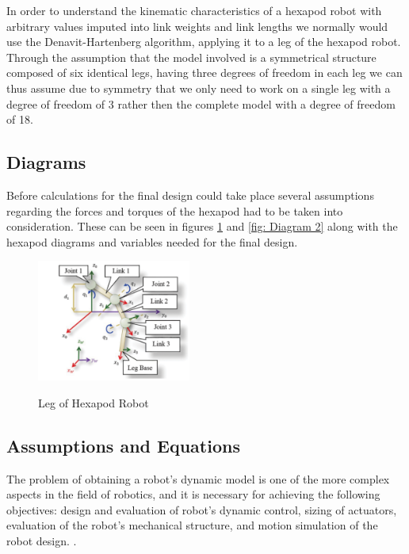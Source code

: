 In order to understand the kinematic characteristics of a hexapod robot with arbitrary values imputed into link weights and link lengths we normally would use the Denavit-Hartenberg algorithm, applying it to a leg of the hexapod robot. Through the assumption that the model involved is a symmetrical structure composed of six identical legs, having three degrees of freedom in each leg we can thus assume due to symmetry that we only need to work on a single leg with a degree of freedom of 3 rather then the complete model with a degree of freedom of 18.



\subsection{Diagrams}
Before calculations for the final design could take place several assumptions regarding the forces and torques of the hexapod had to be taken into consideration. These can be seen in figures \ref{fig: Diagram 1} and \ref{fig: Diagram 2} along with the hexapod diagrams and variables needed for  the final design.


\begin{figure}[h]

 \centering
   \includegraphics[width = 0.45\textwidth]{figures/11.png}            \caption{Leg of Hexapod Robot}
   \label{fig: Diagram 1}
   \cite{pullteap2013development}
\end{figure}



\subsection{Assumptions and Equations}

The problem of obtaining a robot’s dynamic model is one of the more complex aspects in the field of robotics, and it is necessary for achieving the following objectives: design and evaluation of robot’s dynamic control, sizing of actuators, evaluation of the robot’s mechanical structure, and motion simulation of the robot design.  
 \cite{pullteap2013development}.



